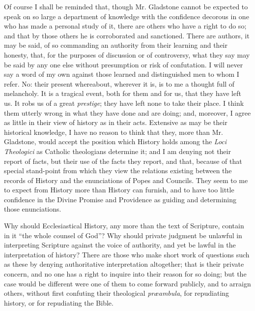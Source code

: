 Of course I shall be reminded that, though Mr. Gladstone cannot be
expected to speak on so large a department of knowledge with the
confidence decorous in one who has made a personal study of it, there
are others who have a right to do so; and that by those others he is
corroborated and sanctioned. There are authors, it may be said, of so
commanding an authority from their learning and their honesty, that, for
the purposes of discussion or of controversy, what they say may be said
by any one else without presumption or risk of confutation. I will never
say a word of my own against those learned and distinguished men to whom
I refer. No: their present whereabout, wherever it is, is to me a
thought full of melancholy. It is a tragical event, both for them and
for us, that they have left us. It robs us of a great \emph{prestige};
they have left none to take their place. I think them utterly wrong in
what they have done and are doing; and, moreover, I agree as little in
their view of history as in their acts. Extensive as may be their
historical knowledge, I have no reason to think that they, more than Mr.
Gladstone, would accept the position which History holds among the \emph{Loci
Theologici} as Catholic theologians determine it; and I am denying
not their report of facts, but their use of the facts they report, and
that, because of that special stand-point from which they view the
relations existing between the records of History and the enunciations
of Popes and Councils. They seem to me to expect from History more than
History can furnish, and to have too little confidence in the
Divine Promise and Providence as guiding and determining those
enunciations.

Why should Ecclesiastical History, any more than the text of
Scripture, contain in it ``the whole counsel of God''? Why
should private judgment be unlawful in interpreting Scripture against
the voice of authority, and yet be lawful in the interpretation of
history? There are those who make short work of questions such as these
by denying authoritative interpretation altogether; that is their
private concern, and no one has a right to inquire into their reason for
so doing; but the case would be different were one of them to come
forward publicly, and to arraign others, without first confuting their
theological \emph{præambula}, for repudiating history, or for
repudiating the Bible.

